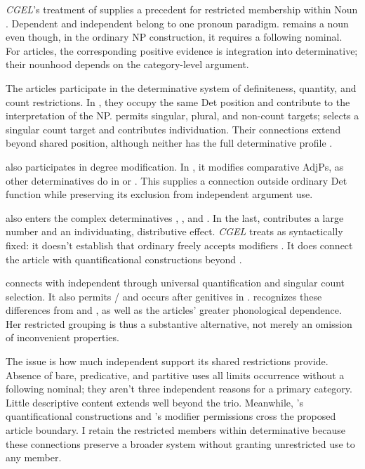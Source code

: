\documentclass[12pt]{article}
\begin{document}
\textit{CGEL}'s treatment of  supplies a precedent for restricted membership within Noun \citep[470--471]{huddleston2002}. Dependent  and independent  belong to one pronoun paradigm.  remains a noun even though, in the ordinary NP construction, it requires a following nominal. For articles, the corresponding positive evidence is integration into determinative; their nounhood depends on the category-level argument.

The articles participate in the determinative system of definiteness, quantity, and count restrictions. In , they occupy the same Det position and contribute to the interpretation of the NP.  permits singular, plural, and non-count targets;  selects a singular count target and contributes individuation. Their connections extend beyond shared position, although neither has the full determinative profile \citep[368--373]{huddleston2002}.

 also participates in degree modification. In , it modifies comparative AdjPs, as other determinatives do in  or  \citep[1131--1132, 1135--1136]{huddleston2002}. This supplies a connection outside ordinary Det function while preserving its exclusion from independent argument use.

 also enters the complex determinatives , , and . In the last,  contributes a large number and  an individuating, distributive effect. \textit{CGEL} treats  as syntactically fixed: it doesn't establish that ordinary  freely accepts modifiers \citep[392--394]{huddleston2002}. It does connect the article with quantificational constructions beyond .

 connects with independent  through universal quantification and singular count selection. It also permits / and occurs after genitives in . \textcite[156--158]{spinillo2004reconceptualising} recognizes these differences from  and , as well as the articles' greater phonological dependence. Her restricted grouping is thus a substantive alternative, not merely an omission of inconvenient properties.

The issue is how much independent support its shared restrictions provide. Absence of bare, predicative, and partitive uses all limits occurrence without a following nominal; they aren't three independent reasons for a primary category. Little descriptive content extends well beyond the trio. Meanwhile, 's quantificational constructions and 's modifier permissions cross the proposed article boundary. I retain the restricted members within determinative because these connections preserve a broader system without granting unrestricted use to any member.
\end{document}
